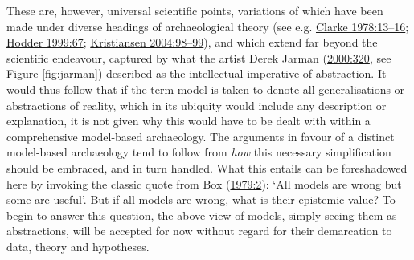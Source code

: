 \documentclass[
  12pt,
  a4paper,
  oneside]{book}
\begin{document}
These are, however, universal scientific points, variations of which have been made under diverse headings of archaeological theory (see e.g. \protect\hyperlink{ref-clarke1978}{Clarke 1978:13--16}; \protect\hyperlink{ref-hodder1999}{Hodder 1999:67}; \protect\hyperlink{ref-kristiansen2004}{Kristiansen 2004:98--99}), and which extend far beyond the scientific endeavour, captured by what the artist Derek Jarman (\protect\hyperlink{ref-jarman2000}{2000:320}, see Figure \ref{fig:jarman}) described as the \textquotesingle intellectual imperative of abstraction\textquotesingle. It would thus follow that if the term model is taken to denote all generalisations or abstractions of reality, which in its ubiquity would include any description or explanation, it is not given why this would have to be dealt with within a comprehensive model-based archaeology. The arguments in favour of a distinct model-based archaeology tend to follow from \emph{how} this necessary simplification should be embraced, and in turn handled. What this entails can be foreshadowed here by invoking the classic quote from Box (\protect\hyperlink{ref-box1979}{1979:2}): `All models are wrong but some are useful'. But if all models are wrong, what is their epistemic value? To begin to answer this question, the above view of models, simply seeing them as abstractions, will be accepted for now without regard for their demarcation to data, theory and hypotheses.
\end{document}
